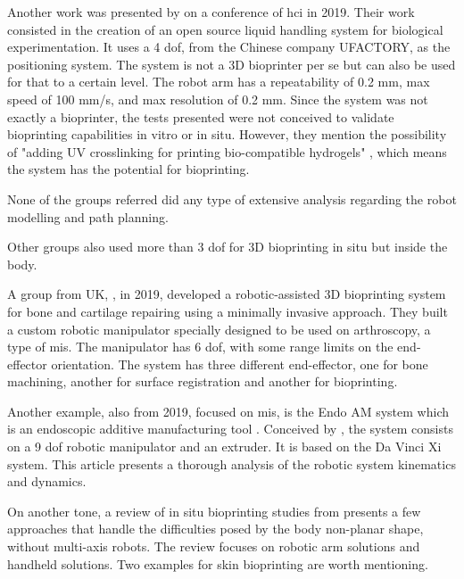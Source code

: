Another work was presented by \citeauthor{Gome2019_openlh}\cite{Gome2019_openlh} on a conference of \gls{hci} in 2019. Their work consisted in the creation of an open source liquid handling system for biological experimentation. It uses a 4 \gls{dof}, from the Chinese company UFACTORY, as the positioning system. The system is not a 3D bioprinter per se but can also be used for that to a certain level. The robot arm has a repeatability of 0.2 mm, max speed of 100 mm/s, and max resolution of 0.2 mm. Since the system was not exactly a bioprinter, the tests presented were not conceived to validate bioprinting capabilities in vitro or in situ. However, they mention the possibility of "adding UV crosslinking for printing bio-compatible hydrogels" \cite{Gome2019_openlh}, which means the system has the potential for bioprinting.

None of the groups referred did any type of extensive analysis regarding the robot modelling and path planning. \bigskip

Other groups also used more than 3 \gls{dof} for 3D bioprinting in situ but inside the body.

A group from UK, \citeauthor{Lipskas2019_robotic_assisted_3dbioprint_repairing_bone_cartilage}\cite{Lipskas2019_robotic_assisted_3dbioprint_repairing_bone_cartilage}, in 2019, developed a robotic-assisted 3D bioprinting system for bone and cartilage repairing using a minimally invasive approach. They built a custom robotic manipulator specially designed to be used on arthroscopy, a type of \gls{mis}. The manipulator has 6 \gls{dof}, with some range limits on the end-effector orientation. The system has three different end-effector, one for bone machining, another for surface registration and another for bioprinting.

Another example, also from 2019, focused on \gls{mis}, is the Endo AM system which is an endoscopic additive manufacturing tool \cite{Simeunovic2019_endoscopic_additive_manufacturing}. Conceived by \citeauthor{Simeunovic2019_endoscopic_additive_manufacturing}, the system consists on a 9 \gls{dof} robotic manipulator and an extruder. It is based on the Da Vinci Xi system. This article presents a thorough analysis of the robotic system kinematics and dynamics.\bigskip

On another tone, a review of in situ bioprinting studies from \citeauthor{Singh2020a_in_situ_bioprinting}\cite{Singh2020a_in_situ_bioprinting} presents a few approaches that handle the difficulties posed by the body non-planar shape, without multi-axis robots. The review focuses on robotic arm solutions and handheld solutions. Two examples for skin bioprinting are worth mentioning.


